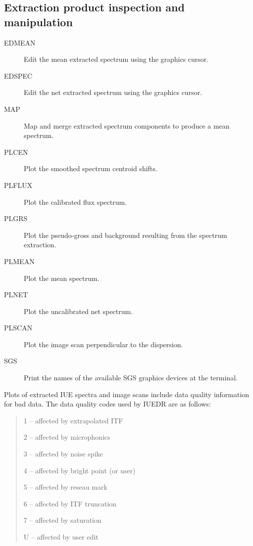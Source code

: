 \subsection {Extraction product inspection and manipulation}

\begin {description}

\item [EDMEAN] Edit the mean extracted spectrum using the graphics
cursor.

\item [EDSPEC] Edit the net extracted spectrum using the graphics
cursor.

\item [MAP] Map and merge extracted spectrum components to produce a
mean  spectrum.

\item [PLCEN] Plot the smoothed spectrum centroid shifts.

\item [PLFLUX] Plot the calibrated flux spectrum.

\item [PLGRS] Plot the pseudo-gross and background resulting from the 
spectrum extraction.

\item [PLMEAN] Plot the mean spectrum.

\item [PLNET] Plot the uncalibrated net spectrum.

\item [PLSCAN] Plot the image scan perpendicular to the dispersion.

\item [SGS] Print the names of the available SGS graphics devices at
the  terminal.

\end {description}

Plots of extracted IUE spectra and image scans include data quality
information for bad data. The data quality codes used by IUEDR are as 
follows:

\begin {quote}
\begin {description}
\item 1 -- affected by extrapolated ITF
\item 2 -- affected by microphonics
\item 3 -- affected by noise spike
\item 4 -- affected by bright point (or user)
\item 5 -- affected by reseau mark
\item 6 -- affected by ITF truncation
\item 7 -- affected by saturation
\item U -- affected by user edit
\end {description}
\end {quote}

